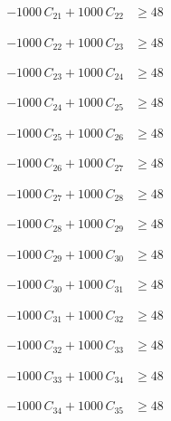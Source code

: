 \documentclass[a4paper,11pt]{article}
\begin{document}
\begin{align}
-1000\,C_{21} + 1000\,C_{22} &\geq 48 \nonumber
\end{align}

\begin{align}
-1000\,C_{22} + 1000\,C_{23} &\geq 48 \nonumber
\end{align}

\begin{align}
-1000\,C_{23} + 1000\,C_{24} &\geq 48 \nonumber
\end{align}

\begin{align}
-1000\,C_{24} + 1000\,C_{25} &\geq 48 \nonumber
\end{align}

\begin{align}
-1000\,C_{25} + 1000\,C_{26} &\geq 48 \nonumber
\end{align}

\begin{align}
-1000\,C_{26} + 1000\,C_{27} &\geq 48 \nonumber
\end{align}

\begin{align}
-1000\,C_{27} + 1000\,C_{28} &\geq 48 \nonumber
\end{align}

\begin{align}
-1000\,C_{28} + 1000\,C_{29} &\geq 48 \nonumber
\end{align}

\begin{align}
-1000\,C_{29} + 1000\,C_{30} &\geq 48 \nonumber
\end{align}

\begin{align}
-1000\,C_{30} + 1000\,C_{31} &\geq 48 \nonumber
\end{align}

\begin{align}
-1000\,C_{31} + 1000\,C_{32} &\geq 48 \nonumber
\end{align}

\begin{align}
-1000\,C_{32} + 1000\,C_{33} &\geq 48 \nonumber
\end{align}

\begin{align}
-1000\,C_{33} + 1000\,C_{34} &\geq 48 \nonumber
\end{align}

\begin{align}
-1000\,C_{34} + 1000\,C_{35} &\geq 48 \nonumber
\end{align}
\end{document}

